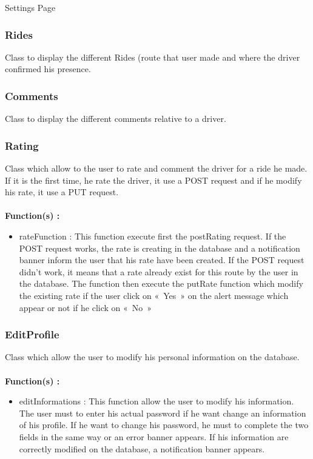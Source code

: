 Settings Page

\subsubsection{Rides}

Class to display the different Rides (route that user made and where the driver confirmed his presence.

\subsubsection{Comments}

Class to display the different comments relative to a driver.

\subsubsection{Rating}

Class which allow to the user to rate and comment the driver for a ride he made. If it is the first time, he rate the driver, it use a POST request and if he modify his rate, it use a PUT request.
\\\\
\textbf{Function(s) :}

\begin{itemize}	
\item rateFunction : This function execute first the postRating request. If the POST request works, the rate is creating in the database and a notification banner inform the user that his rate have been created. If the POST request didn’t work, it means that a rate already exist for this route by the user in the database. The function then execute the putRate function which modify the existing rate if the user click on « Yes » on the alert message which appear or not if he click 	on « No »
\end{itemize}

\subsubsection{EditProfile}

Class which allow the user to modify his personal information on the database.
\\\\
\textbf{Function(s) :}

\begin{itemize}
\item editInformations : This function allow the user to modify his information. The user must to enter his actual password if he want change an information of his profile. If he want to change his password, he must to complete the two fields in the same way or an error banner appears. If his information are correctly modified on the database, a notification banner appears.
\end{itemize}

